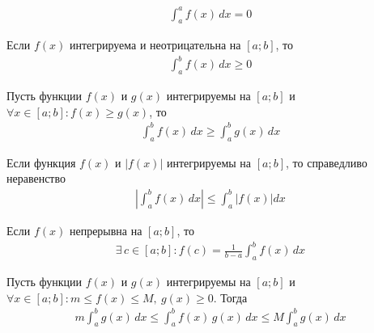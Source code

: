 \begin{corollary}
    \begin{gather*}
        \int_{a}^{a} f(x)\, dx = 0
    \end{gather*}
\end{corollary}

\begin{theorem}
    Если $f(x)$ интегрируема и неотрицательна на $[a;b]$, то 
    \begin{gather*}
        \boxed{\int_{a}^{b} f(x)\, dx \geqslant 0}
    \end{gather*}
\end{theorem}

\begin{theorem}
    Пусть функции $f(x)$ и $g(x)$ интегрируемы на $[a;b]$ и $\forall x \in [a;b]\colon f(x) \geqslant g(x)$, то
    \begin{gather*}
        \boxed{\int_{a}^{b} f(x)\, dx \geqslant \int_{a}^{b}g(x)\, dx}
    \end{gather*}
\end{theorem}

\begin{theorem}
    Если функция $f(x)$ и $|f(x)|$ интегрируемы на $[a;b]$, то справедливо неравенство
    \begin{gather*}
        \boxed{\left| \int_{a}^{b} f(x)\, dx \right| \leqslant \int_{a}^{b} \big|f(x)\big| dx}
    \end{gather*}
\end{theorem}

\begin{theorem}
    Если $f(x)$ непрерывна на $[a;b]$, то
    \begin{gather*}
        \exists\, c \in [a;b]\colon f(c) = \frac{1}{b-a} \int_{a}^{b} f(x)\, dx
    \end{gather*}
\end{theorem}

\newpage
\begin{theorem}
    Пусть функции $f(x)$ и $g(x)$ интегрируемы на $[a;b]$ и $\forall x \in [a;b]\colon m \leqslant f(x) \leqslant M,\ {g(x) \geqslant 0}$. Тогда
    \begin{gather*}
        \boxed{m \int_{a}^{b} g(x)\, dx \leqslant \int_{a}^{b} f(x)\, g(x)\, dx \leqslant M \int_{a}^{b} g(x)\, dx}
    \end{gather*}
\end{theorem}

